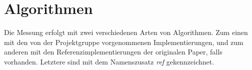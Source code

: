 \section{Algorithmen}

Die Messung erfolgt mit zwei verschiedenen Arten von Algorithmen. Zum einen mit den von der Projektgruppe vorgenommenen Implementierungen, und zum anderen mit den Referenzimplementierungen der originalen Paper, falls vorhanden. Letztere sind mit dem Namenszusatz \textit{ref} gekennzeichnet.
